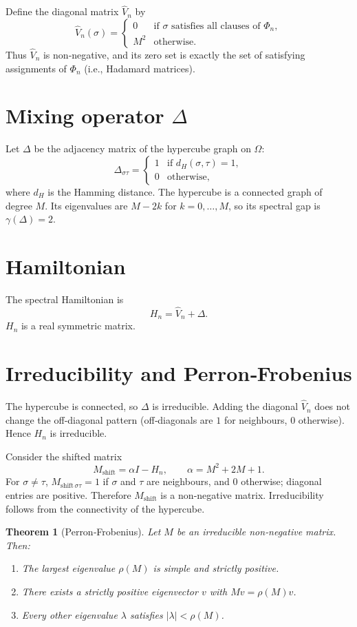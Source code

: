 \documentclass[11pt,a4paper]{article}
\newtheorem{theorem}{Theorem}[section]
\begin{document}
Define the diagonal matrix $\hat{V}_n$ by
\[
\hat{V}_n(\sigma) = \begin{cases}
0 & \text{if }\sigma\text{ satisfies all clauses of } \Phi_n,\\
M^2 & \text{otherwise}.
\end{cases}
\]
Thus $\hat{V}_n$ is non‑negative, and its zero set is exactly the set of satisfying assignments of $\Phi_n$ (i.e., Hadamard matrices).

\section{Mixing operator $\Delta$}

Let $\Delta$ be the adjacency matrix of the hypercube graph on $\Omega$:
\[
\Delta_{\sigma\tau} = \begin{cases}
1 & \text{if } d_H(\sigma,\tau)=1,\\
0 & \text{otherwise},
\end{cases}
\]
where $d_H$ is the Hamming distance. The hypercube is a connected graph of degree $M$. Its eigenvalues are $M-2k$ for $k=0,\dots,M$, so its spectral gap is $\gamma(\Delta)=2$.

\section{Hamiltonian}

The spectral Hamiltonian is
\[
H_n = \hat{V}_n + \Delta.
\]
$H_n$ is a real symmetric matrix.

\section{Irreducibility and Perron‑Frobenius}

The hypercube is connected, so $\Delta$ is irreducible. Adding the diagonal $\hat{V}_n$ does not change the off‑diagonal pattern (off‑diagonals are $1$ for neighbours, $0$ otherwise). Hence $H_n$ is irreducible.

Consider the shifted matrix
\[
M_{\text{shift}} = \alpha I - H_n,\qquad \alpha = M^2 + 2M + 1.
\]
For $\sigma\neq\tau$, $M_{\text{shift}\,\sigma\tau} = 1$ if $\sigma$ and $\tau$ are neighbours, and $0$ otherwise; diagonal entries are positive. Therefore $M_{\text{shift}}$ is a non‑negative matrix. Irreducibility follows from the connectivity of the hypercube.

\begin{theorem}[Perron‑Frobenius]
Let $M$ be an irreducible non‑negative matrix. Then:
\begin{enumerate}
\item The largest eigenvalue $\rho(M)$ is simple and strictly positive.
\item There exists a strictly positive eigenvector $v$ with $Mv = \rho(M)v$.
\item Every other eigenvalue $\lambda$ satisfies $|\lambda| < \rho(M)$.
\end{enumerate}
\end{theorem}
\end{document}
